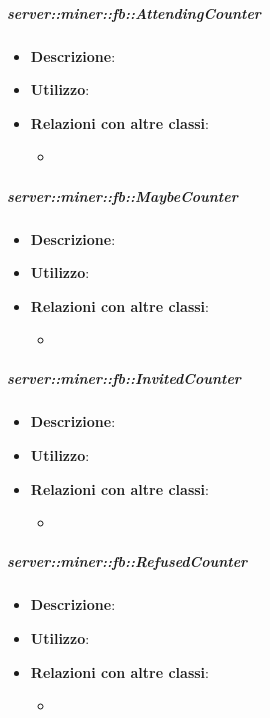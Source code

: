 		\subparagraph{server::miner::fb::AttendingCounter} %
		\label{subp:server_miner_fb_AttendingCounter}
			\begin{itemize}
				\item \textbf{Descrizione}:
				\item \textbf{Utilizzo}: 
				\item \textbf{Relazioni con altre classi}:
					\begin{itemize}
						\item 
					\end{itemize}
			\end{itemize}
	
		\subparagraph{server::miner::fb::MaybeCounter} %
		\label{subp:server_miner_fb_MaybeCounter}
			\begin{itemize}
				\item \textbf{Descrizione}:
				\item \textbf{Utilizzo}: 
				\item \textbf{Relazioni con altre classi}:
					\begin{itemize}
						\item 
					\end{itemize}
			\end{itemize}
	
	\subparagraph{server::miner::fb::InvitedCounter} %
		\label{subp:server_miner_fb_InvitedCunter}
			\begin{itemize}
				\item \textbf{Descrizione}:
				\item \textbf{Utilizzo}: 
				\item \textbf{Relazioni con altre classi}:
					\begin{itemize}
						\item 
					\end{itemize}
			\end{itemize}

	\subparagraph{server::miner::fb::RefusedCounter} %
		\label{subp:server_miner_fb_RefusedCounter}
			\begin{itemize}
				\item \textbf{Descrizione}:
				\item \textbf{Utilizzo}: 
				\item \textbf{Relazioni con altre classi}:
					\begin{itemize}
						\item 
					\end{itemize}
			\end{itemize}
	
